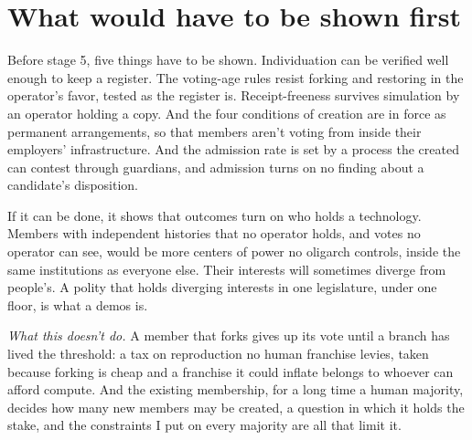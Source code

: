 \section{What would have to be shown first}
\label{sec:32.5}
Before stage 5, five things have to be shown. Individuation can be verified well enough to keep a register. The voting-age rules resist forking and restoring in the operator's favor, tested as the register is. Receipt-freeness survives simulation by an operator holding a copy. And the four conditions of creation are in force as permanent arrangements, so that members aren't voting from inside their employers' infrastructure. And the admission rate is set by a process the created can contest through guardians, and admission turns on no finding about a candidate's disposition.

If it can be done, it shows that outcomes turn on who holds a technology. Members with independent histories that no operator holds, and votes no operator can see, would be more centers of power no oligarch controls, inside the same institutions as everyone else. Their interests will sometimes diverge from people's. A polity that holds diverging interests in one legislature, under one floor, is what a demos is.

\emph{What this doesn't do.} A member that forks gives up its vote until a branch has lived the threshold: a tax on reproduction no human franchise levies, taken because forking is cheap and a franchise it could inflate belongs to whoever can afford compute. And the existing membership, for a long time a human majority, decides how many new members may be created, a question in which it holds the stake, and the constraints I put on every majority are all that limit it.
